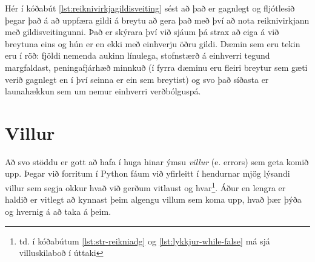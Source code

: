 Hér í kóðabút \ref{lst:reiknivirkjagildisveiting} sést að það er gagnlegt og fljótlesið þegar það á að uppfæra gildi á breytu að gera það með því að nota reiknivirkjann með gildisveitingunni.
Það er skýrara því við sjáum þá strax að eiga á við breytuna eins og hún er en ekki með einhverju öðru gildi.
Dæmin sem eru tekin eru í röð: fjöldi nemenda aukinn línulega, stofnstærð á einhverri tegund margfaldast, peningafjárhæð minnkuð (í fyrra dæminu eru fleiri breytur sem gæti verið gagnlegt en í því seinna er ein sem breytist) og svo það síðasta er launahækkun sem um nemur einhverri verðbólguspá.

\section{Villur}\label{uk:tolur-villur}
Að svo stöddu er gott að hafa í huga hinar ýmsu \emph{villur} (e. errors) sem geta komið upp.
Þegar við forritum í Python fáum við yfirleitt í hendurnar mjög lýsandi villur sem segja okkur hvað við gerðum vitlaust og hvar\footnote{td. í kóðabútum \ref{lst:str-reikniadg} og \ref{lst:lykkjur-while-false} má sjá villuskilaboð í úttaki}.
Áður en lengra er haldið er vitlegt að kynnast þeim algengu villum sem koma upp, hvað þær þýða og hvernig á að taka á þeim.

